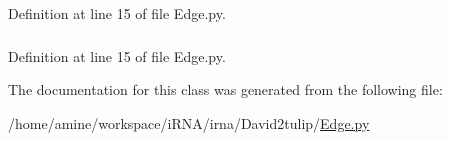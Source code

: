 \-Definition at line 15 of file \-Edge.\-py.

\hypertarget{classirna_1_1David2tulip_1_1Edge_1_1Edge_af03bd8fdf12411e153ae3930d2a76033}{
\subsubsection[{term\-Name}]{}}
\label{classirna_1_1David2tulip_1_1Edge_1_1Edge_af03bd8fdf12411e153ae3930d2a76033}


\-Definition at line 15 of file \-Edge.\-py.



\-The documentation for this class was generated from the following file\-:\begin{DoxyCompactItemize}
\item 
/home/amine/workspace/i\-R\-N\-A/irna/\-David2tulip/\hyperlink{Edge_8py}{\-Edge.\-py}\end{DoxyCompactItemize}
